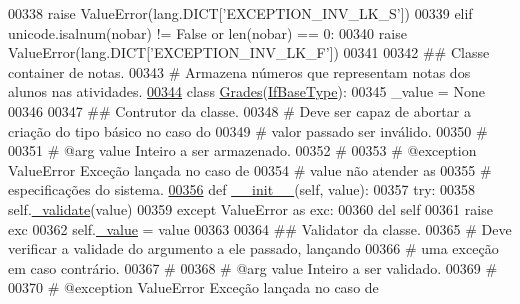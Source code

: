 \begin{DoxyCode}
00338             \textcolor{keywordflow}{raise} ValueError(lang.DICT[\textcolor{stringliteral}{'EXCEPTION\_INV\_LK\_S'}])
00339         \textcolor{keywordflow}{elif} unicode.isalnum(nobar) != \textcolor{keyword}{False} \textcolor{keywordflow}{or} len(nobar) == 0:
00340             \textcolor{keywordflow}{raise} ValueError(lang.DICT[\textcolor{stringliteral}{'EXCEPTION\_INV\_LK\_F'}])
00341 
00342 \textcolor{comment}{## Classe container de notas.}
00343 \textcolor{comment}{#   Armazena números que representam notas dos alunos nas atividades.}
\hypertarget{BaseUnit_8py_source_l00344}{}\hyperlink{classELO_1_1BaseUnit_1_1Grades}{00344} \textcolor{keyword}{class }\hyperlink{classELO_1_1BaseUnit_1_1Grades}{Grades}(\hyperlink{classELO_1_1BaseUnit_1_1IfBaseType}{IfBaseType}):
00345     \_value = \textcolor{keywordtype}{None}
00346 
00347     \textcolor{comment}{## Contrutor da classe.}
00348     \textcolor{comment}{#   Deve ser capaz de abortar a criação do tipo básico no caso do}
00349     \textcolor{comment}{#   valor passado ser inválido.}
00350     \textcolor{comment}{#}
00351     \textcolor{comment}{#   @arg        value       Inteiro a ser armazenado.}
00352     \textcolor{comment}{#}
00353     \textcolor{comment}{#   @exception  ValueError  Exceção lançada no caso de}
00354     \textcolor{comment}{#                           value não atender as}
00355     \textcolor{comment}{#                           especificações do sistema.}
\hypertarget{BaseUnit_8py_source_l00356}{}\hyperlink{classELO_1_1BaseUnit_1_1Grades_acf3b3d08a543e7a8084f8ddd3c577c88}{00356}     \textcolor{keyword}{def }\hyperlink{classELO_1_1BaseUnit_1_1Grades_acf3b3d08a543e7a8084f8ddd3c577c88}{\_\_init\_\_}(self, value):
00357         \textcolor{keywordflow}{try}:
00358             self.\hyperlink{classELO_1_1BaseUnit_1_1IfBaseType_acf84c5906a39b605a23ab68c4ca1dd19}{\_validate}(value)
00359         \textcolor{keywordflow}{except} ValueError \textcolor{keyword}{as} exc:
00360             del self
00361             \textcolor{keywordflow}{raise} exc
00362         self.\hyperlink{classELO_1_1BaseUnit_1_1IfBaseType_ad05d9d377fc4b99743c022cc8f6019d7}{\_value} = value
00363 
00364     \textcolor{comment}{## Validator da classe.}
00365     \textcolor{comment}{#   Deve verificar a validade do argumento a ele passado, lançando}
00366     \textcolor{comment}{#   uma exceção em caso contrário.}
00367     \textcolor{comment}{#}
00368     \textcolor{comment}{#   @arg        value       Inteiro a ser validado.}
00369     \textcolor{comment}{#}
00370     \textcolor{comment}{#   @exception  ValueError  Exceção lançada no caso de}

\end{DoxyCode}
